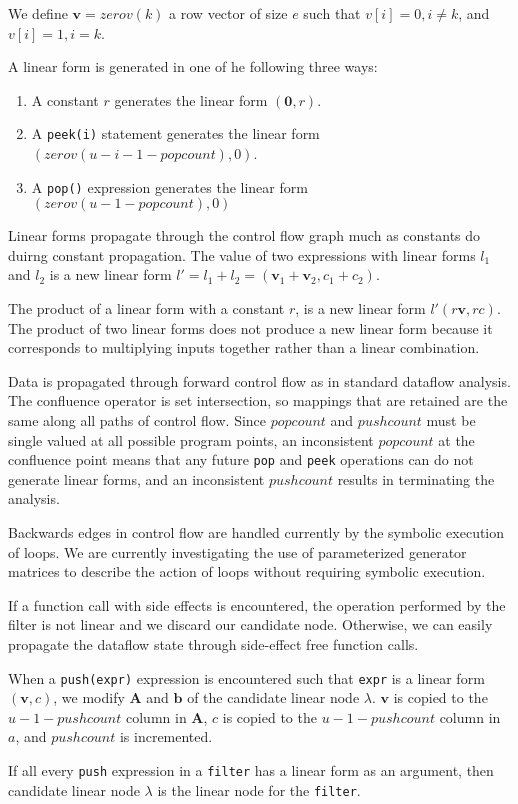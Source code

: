 We define ${\mathbf v} = zerov(k)$ a row vector of size $e$ such that 
$v[i]=0, i \neq k$, and $v[i]=1,i=k$.

A linear form is generated in one of he following three ways:
\begin{enumerate}
\item A constant $r$ generates the linear form $({\mathbf 0},r)$. 
\vspace{-6pt}

\item A {\tt peek(i)} statement generates the linear form 
$(zerov(u-i-1-popcount), 0)$.
\vspace{-6pt}

\item A {\tt pop()} expression generates the linear form 
$(zerov(u-1-popcount),0)$

\vspace{-6pt}
\end{enumerate}

Linear forms propagate through the control flow graph much as constants do
duirng constant propagation. The value of two expressions with linear forms $l_1$ 
and $l_2$ is a new linear form $l'=l_1+l_2=({\mathbf v}_1+{\mathbf v}_2, c_1+c_2)$.

The product of a linear form with a constant $r$, is a new linear form 
$l' (r{\mathbf v},rc)$. The product of two linear forms does not produce a 
new linear form because it corresponds to multiplying inputs together rather than
a linear combination. 

Data is propagated through forward control flow as in standard dataflow analysis. 
The confluence operator is set intersection, so mappings that are retained are the same 
along all paths of control flow. Since $popcount$ and $pushcount$ must be single
valued at all possible program points, an inconsistent $popcount$ at the
confluence point means that any future {\tt pop} and {\tt peek} operations can
do not generate linear forms, and an inconsistent $pushcount$ results in
terminating the analysis.

Backwards edges in control flow are handled currently by the symbolic execution
of loops. We are currently investigating the use of parameterized generator matrices 
to describe the action of loops without requiring symbolic execution.

If a function call with side effects is encountered, the operation performed
by the filter is not linear and we discard our candidate node. Otherwise, 
we can easily propagate the dataflow state through side-effect free function calls. 

When a {\tt push(expr)} expression is encountered such that {\tt expr} is a linear form 
$({\mathbf v},c)$, we modify ${\mathbf A}$ and ${\mathbf b}$ of the candidate linear node $\lambda$.
${\mathbf v}$ is copied to the $u-1-pushcount$ column in ${\mathbf A}$,
$c$ is copied to the $u-1-pushcount$ column in $a$, and $pushcount$ is incremented.

If all every {\tt push} expression in a {\tt filter} has a linear form as an argument,
then candidate linear node $\lambda$ is the linear node for the {\tt filter}.